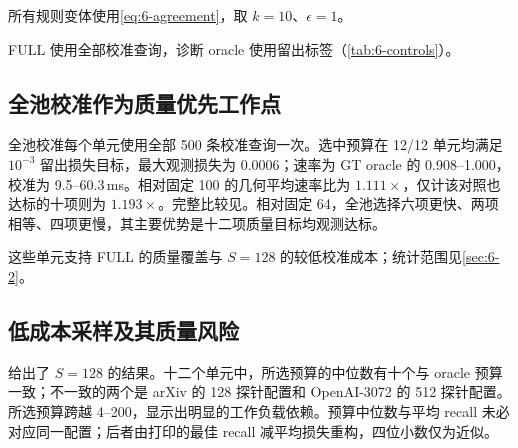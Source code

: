 所有规则变体使用\cref{eq:6-agreement}，取 $k=10$、$\epsilon=1$。


FULL 使用全部校准查询，诊断 oracle 使用留出标签（\cref{tab:6-controls}）。


\subsection{全池校准作为质量优先工作点}

全池校准每个单元使用全部 500 条校准查询一次。选中预算在 12/12 单元均满足 $10^{-3}$ 留出损失目标，最大观测损失为 0.0006；速率为 GT oracle 的 0.908--1.000，校准为 9.5--60.3\,ms。相对固定 100 的几何平均速率比为 $1.111\times$，仅计该对照也达标的十项则为 $1.193\times$。完整比较见。相对固定 64，全池选择六项更快、两项相等、四项更慢，其主要优势是十二项质量目标均观测达标。

这些单元支持 FULL 的质量覆盖与 $S=128$ 的较低校准成本；统计范围见\cref{sec:6-2}。


\begin{table}[tbp]
\centering
\caption[全池预算校准]{全池校准（$S=500$）。损失相对最佳实测留出 recall；速率为所选固定预算的 kQPS。“校准”每项仅一次全池调用，不是重复查询流计时。留出为 500 条，Stella 为 499。}
\label{tab:7-budget-full}
\footnotesize\setlength{\tabcolsep}{3pt}

\end{table}

\subsection{低成本采样及其质量风险}

 给出了 $S=128$ 的结果。十二个单元中，所选预算的中位数有十个与 oracle 预算一致；不一致的两个是 arXiv 的 128 探针配置和 OpenAI-3072 的 512 探针配置。所选预算跨越 4--200，显示出明显的工作负载依赖。预算中位数与平均 recall 未必对应同一配置；后者由打印的最佳 recall 减平均损失重构，四位小数仅为近似。

\begin{table}[tbp]
\centering
\caption[采样预算的留出质量]{$S=128$ 时的留出质量。规则的 $\alpha$ 是 64 次抽样的中位数，oracle 的 $\alpha$ 使用留出标签。$\overline R_{\rm rule}$ 是重构的平均召回率。“超标”统计相对最佳被测留出召回率损失 $>10^{-3}$ 的抽样次数；$L_{95}$ 是日志采用较低次序统计量得到的 95 分位损失估计。$R_{100}$ 是固定预算召回率。}
\label{tab:7-budget-quality}
\small\setlength{\tabcolsep}{3pt}

\end{table}

